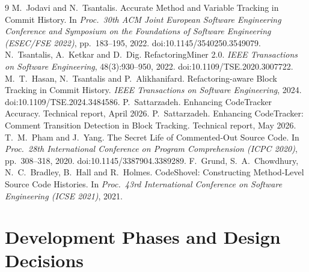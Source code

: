 \documentclass[11pt,a4paper]{article}
\begin{document}
\begin{thebibliography}{9}
 M.~Jodavi and N.~Tsantalis. Accurate Method and Variable Tracking in Commit History. In \emph{Proc.\ 30th ACM Joint European Software Engineering Conference and Symposium on the Foundations of Software Engineering (ESEC/FSE 2022)}, pp.~183--195, 2022. doi:10.1145/3540250.3549079.
 N.~Tsantalis, A.~Ketkar and D.~Dig. RefactoringMiner 2.0. \emph{IEEE Transactions on Software Engineering}, 48(3):930--950, 2022. doi:10.1109/TSE.2020.3007722.
 M.~T.~Hasan, N.~Tsantalis and P.~Alikhanifard. Refactoring-aware Block Tracking in Commit History. \emph{IEEE Transactions on Software Engineering}, 2024. doi:10.1109/TSE.2024.3484586.
 P.~Sattarzadeh. Enhancing CodeTracker Accuracy. Technical report, April 2026.
 P.~Sattarzadeh. Enhancing CodeTracker: Comment Transition Detection in Block Tracking. Technical report, May 2026.
 T.~M.~Pham and J.~Yang. The Secret Life of Commented-Out Source Code. In \emph{Proc.\ 28th International Conference on Program Comprehension (ICPC 2020)}, pp.~308--318, 2020. doi:10.1145/3387904.3389289.
 F.~Grund, S.~A.~Chowdhury, N.~C.~Bradley, B.~Hall and R.~Holmes. CodeShovel: Constructing Method-Level Source Code Histories. In \emph{Proc.\ 43rd International Conference on Software Engineering (ICSE 2021)}, 2021.
\end{thebibliography}

\clearpage
\appendix
\section{Development Phases and Design Decisions}\label{app:phases}
\end{document}
